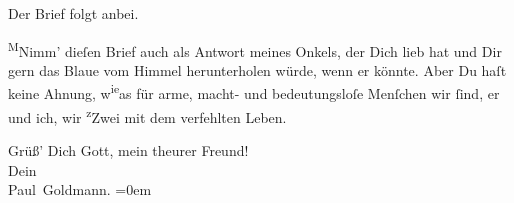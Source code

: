 \pstart
           Der Brief folgt anbei.\pend
           
\pstart
           {\pb}\substVorne{}\textsuperscript{M}\substDazwischen{}N\substHinten{}imm’ dieſen Brief auch als Antwort meines Onkels, der Dich lieb hat und Dir gern das Blaue vom Himmel
               herunterholen würde, wenn er könnte. Aber Du haſt keine Ahnung, w\substVorne{}\textsuperscript{ie}\substDazwischen{}a\substHinten{}s für arme, macht- und bedeutungsloſe Menſchen wir{ }ſind, er und ich, wir \substVorne{}\textsuperscript{z}\substDazwischen{}Z\substHinten{}wei mit dem verfehlten Leben.\pend
           
\pstart
           Grüß’ Dich Gott, mein theurer Freund! {\\[\baselineskip]}Dein {\\[\baselineskip]}\spacefill\mbox{Paul Goldmann.}\pend
           \leftskip=0em{}\endnumbering{}  \newcommand{\dateiname}{L02709}\newcommand{\titel}{Paul Goldmann an Arthur Schnitzler, 3. 6. 1893}\newcommand{\editorInnen}{Martin Anton Müller und Laura Untner}
